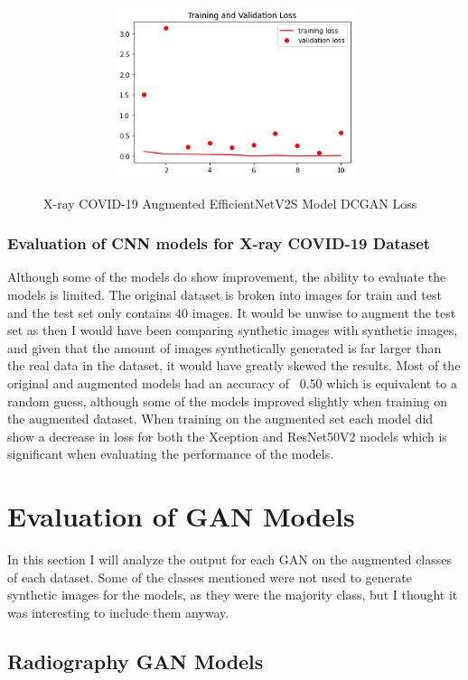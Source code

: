  \begin{figure}[H]
    \centering
    \includegraphics[width=1\textwidth,height=5cm,keepaspectratio]{Images/EfficientNetV2SBaselineTrainingValidationLossXRayCOVID19AugmentedDCGAN.png}\\
    \caption{X-ray COVID-19 Augmented EfficientNetV2S Model DCGAN Loss}
    \label{fig:X-ray COVID-19 Augmented EfficientNetV2S Model DCGAN Loss}
\end{figure}
\subsubsection{Evaluation of CNN models for X-ray COVID-19 Dataset}
Although some of the models do show improvement, the ability to evaluate the models is limited.  The original dataset is broken into images for train and test and the test set only contains 40 images.  It would be unwise to augment the test set as then I would have been comparing synthetic images with synthetic images, and given that the amount of images synthetically generated is far larger than the real data in the dataset, it would have greatly skewed the results.  Most of the original and augmented models had an accuracy of ~0.50 which is equivalent to a random guess, although some of the models improved slightly when training on the augmented dataset.  When training on the augmented set each model did show a decrease in loss for both the Xception and ResNet50V2 models which is significant when evaluating the performance of the models.
\section{Evaluation of GAN Models}
In this section I will analyze the output for each GAN on the augmented classes of each dataset.  Some of the classes mentioned were not used to generate synthetic images for the models, as they were the majority class, but I thought it was interesting to include them anyway.
\subsection{Radiography GAN Models}
